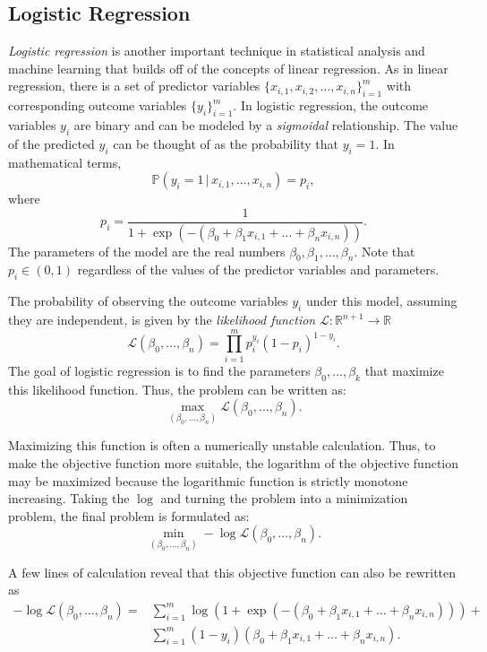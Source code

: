 \subsection*{Logistic Regression} %

\emph{Logistic regression} is another important technique in statistical analysis and machine learning that builds off of the concepts of linear regression.
As in linear regression, there is a set of predictor variables $\{x_{i, 1}, x_{i, 2}, \dots, x_{i, n}\}_{i = 1}^{m}$ with corresponding outcome variables $\{y_i\}_{i = 1}^{m}$.
In logistic regression, the outcome variables $y_i$ are binary and can be modeled by a \emph{sigmoidal} relationship.
The value of the predicted $y_i$ can be thought of as the probability that $y_i = 1$.
In mathematical terms,
\[
\mathbb{P}(y_i = 1 \, | \, x_{i,1}, \dots, x_{i,n}) = p_i,
\]
where
\[
p_i = \frac{1}{1+\exp(-(\beta_0 + \beta_1x_{i,1} + \dots + \beta_nx_{i,n}))}.
\]
The parameters of the model are the real numbers $\beta_0, \beta_1,\dots, \beta_n$.
Note that $p_i \in (0, 1)$ regardless of the values of the predictor variables and parameters.

The probability of observing the outcome variables $y_i$ under this model, assuming they are independent, is given by
the \emph{likelihood function} $\mathcal{L}:\mathbb{R}^{n+1} \rightarrow \mathbb{R}$
\[
\mathcal{L}(\beta_0, \dots, \beta_n) = \prod_{i=1}^m p_i^{y_i}(1-p_i)^{1-y_i}.
\]
The goal of logistic regression is to find the parameters $\beta_0, \dots, \beta_k$ that maximize this likelihood function.
Thus, the problem can be written as:
\[
\max_{(\beta_0,\dots,\beta_n)}\mathcal{L}(\beta_0, \dots, \beta_n).
\]

Maximizing this function is often a numerically unstable calculation.
Thus, to make the objective function more suitable, the logarithm of the objective function may be maximized because the logarithmic function is strictly monotone increasing.
Taking the $\log$ and turning the problem into a minimization problem, the final problem is formulated as:
\[
\min_{(\beta_0,\dots,\beta_n)} - \log\mathcal{L}(\beta_0, \dots, \beta_n).
\]

A few lines of calculation reveal that this objective function can also be rewritten as
\begin{align*}
-\log\mathcal{L}(\beta_0,\dots,\beta_n) = &\sum_{i=1}^{m}\log(1+\exp(-(\beta_0 + \beta_1x_{i,1} + \dots +\beta_nx_{i,n}))) +\\
 &\sum_{i=1}^m (1- y_i)(\beta_0 + \beta_1x_{i,1} + \dots + \beta_nx_{i,n}).
\end{align*}

